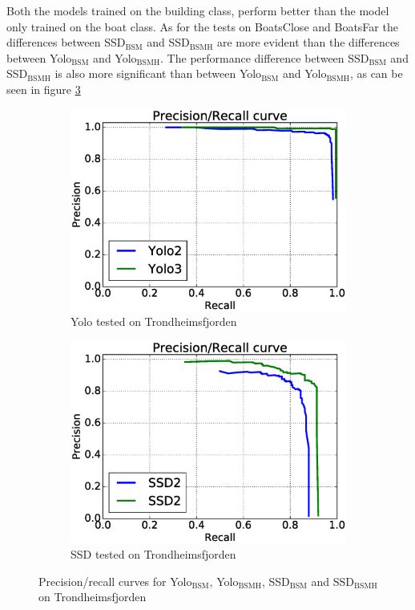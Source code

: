 \vspace{3mm}

Both the models trained on the building class, perform better than the model only trained on the boat class. As for the tests on BoatsClose and BoatsFar the differences between SSD$_{\text{BSM}}$ and SSD$_{\text{BSMH}}$ are more evident than the differences between Yolo$_{\text{BSM}}$ and Yolo$_{\text{BSMH}}$. The performance difference between SSD$_{\text{BSM}}$ and SSD$_{\text{BSMH}}$ is also more significant than between Yolo$_{\text{BSM}}$ and Yolo$_{\text{BSMH}}$, as can be seen in figure \ref{fig:trf_prec}


\begin{figure}[h!]
\begin{subfigure}{.5\textwidth}
  \centering
  \includegraphics[width=0.8\linewidth]{results/case_buildings/prec_recall/yolo/trf.eps}
  \caption{Yolo tested on Trondheimsfjorden}
  \label{fig:ex_trf_prec_rec_yolo}
\end{subfigure}%
\begin{subfigure}{.5\textwidth}
  \centering
  \includegraphics[width=.8\linewidth]{results/case_buildings/prec_recall/ssd/trf.eps}
  \caption{SSD tested on Trondheimsfjorden}
  \label{fig:ex_trf_prec_rec_ssd}
\end{subfigure}
\caption{Precision/recall curves for Yolo$_{\text{BSM}}$, Yolo$_{\text{BSMH}}$, SSD$_{\text{BSM}}$ and SSD$_{\text{BSMH}}$ on Trondheimsfjorden}
\label{fig:trf_prec}
\end{figure}

